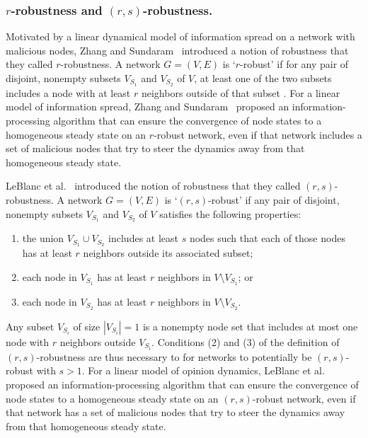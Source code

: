 \documentclass{comnet-mod}
\begin{document}
\subsubsection{$r$-robustness and $(r,s)$-robustness.}\label{sec:r-robustness}

Motivated by a linear dynamical model of information spread on a network with malicious nodes, Zhang and Sundaram~\cite{Zhang2012} introduced a notion of robustness that they called $r$-robustness. A network $G=(V,E)$ is `$r$-robust' if for any pair of disjoint, nonempty subsets $V_{S_1}$ and $V_{S_2}$ of $V$, at least one of the two subsets includes a node with at least $r$ neighbors outside of that subset 
\cite{Zhang2012}. 
For a linear model of information spread, Zhang and Sundaram~\cite{Zhang2012} proposed an information-processing algorithm that can ensure the convergence of node states to a homogeneous steady state on an $r$-robust network, even if that network includes a set of malicious nodes that try to steer the dynamics away from that homogeneous steady state.

LeBlanc et al.~\cite{LeBlanc2012} introduced the notion of robustness that they called $(r,s)$-robustness. A network $G=(V,E)$ is `$(r,s)$-robust' if any pair of disjoint, nonempty subsets $V_{S_1}$ and $V_{S_2}$ of $V$ satisfies the following properties:
\begin{enumerate}
    \item the union $V_{S_1} \cup V_{S_2}$ includes at least $s$ nodes such that each of those nodes has at least $r$ neighbors outside its associated subset; 
    \item each node in $V_{S_1}$ has at least $r$ neighbors in $V\setminus V_{S_1}$; or
    \item each node in $V_{S_2}$ has at least $r$ neighbors in $V\setminus V_{S_2}$. 
\end{enumerate} 
Any subset $V_{S_i}$ of size $|V_{S_i}| = 1$ is a nonempty node set that includes at most one node with $r$ neighbors outside $V_{S_i}$. Conditions (2) and (3) of the definition of $(r,s)$-robustness are thus necessary to for networks to potentially be $(r,s)$-robust with $s > 1$.
For a linear model of opinion dynamics, LeBlanc et al.~\cite{LeBlanc2012} proposed an information-processing algorithm that can ensure the convergence of node states to a homogeneous steady state on an $(r,s)$-robust network, even if that network has a set of malicious nodes that try to steer the dynamics away from that homogeneous steady state.
\end{document}
